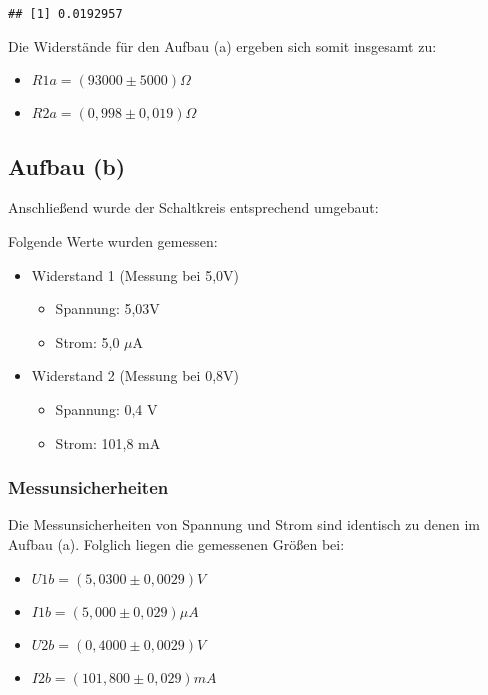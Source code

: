 \documentclass[
  9pt,
]{article}
\begin{document}
\begin{verbatim}
## [1] 0.0192957
\end{verbatim}

Die Widerstände für den Aufbau (a) ergeben sich somit insgesamt zu:

\begin{itemize}
\item $R1a = (93000 \pm 5000)\Omega $
\item $R2a = (0,998 \pm 0,019) \Omega$
\end{itemize}

\hypertarget{aufbau-b}{%
\subsection{Aufbau (b)}\label{aufbau-b}}

Anschließend wurde der Schaltkreis entsprechend umgebaut:

Folgende Werte wurden gemessen:

\begin{itemize}
\item {Widerstand 1 (Messung bei 5,0V)}
\begin{itemize}
\item {Spannung: 5,03V}
\item {Strom: 5,0 $\mu$A}
\end{itemize}
\item {Widerstand 2 (Messung bei 0,8V)}
\begin{itemize}
\item {Spannung: 0,4 V}
\item {Strom: 101,8 mA}
\end{itemize}
\end{itemize}

\hypertarget{messunsicherheiten-2}{%
\subsubsection{Messunsicherheiten}\label{messunsicherheiten-2}}

Die Messunsicherheiten von Spannung und Strom sind identisch zu denen im
Aufbau (a). Folglich liegen die gemessenen Größen bei:

\begin{itemize}
\item $U1b = (5,0300 \pm 0,0029)V$
\item $I1b = (5,000 \pm 0,029) \mu A$
\item $U2b = (0,4000 \pm 0,0029)V$
\item $I2b = (101,800 \pm 0,029) mA$
\end{itemize}
\end{document}
